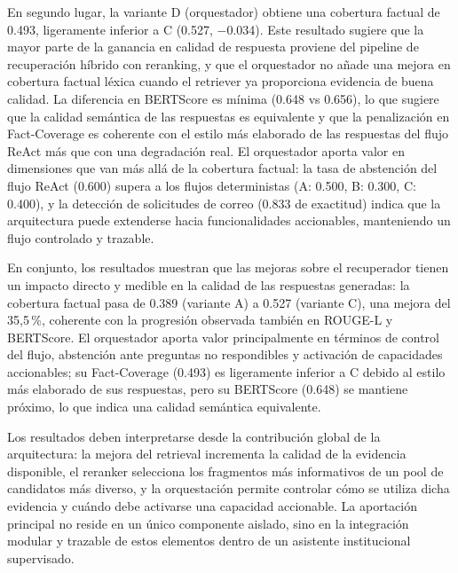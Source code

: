 En segundo lugar, la variante D (orquestador) obtiene una cobertura factual de 0.493, ligeramente inferior a C (0.527, $-$0.034).
Este resultado sugiere que la mayor parte de la ganancia en calidad de respuesta proviene del pipeline de recuperación híbrido con reranking, y que el orquestador no añade una mejora en cobertura factual léxica cuando el retriever ya proporciona evidencia de buena calidad.
La diferencia en BERTScore es mínima (0.648 vs 0.656), lo que sugiere que la calidad semántica de las respuestas es equivalente y que la penalización en Fact-Coverage es coherente con el estilo más elaborado de las respuestas del flujo ReAct más que con una degradación real.
El orquestador aporta valor en dimensiones que van más allá de la cobertura factual: la tasa de abstención del flujo ReAct (0.600) supera a los flujos deterministas (A: 0.500, B: 0.300, C: 0.400), y la detección de solicitudes de correo (0.833 de exactitud) indica que la arquitectura puede extenderse hacia funcionalidades accionables, manteniendo un flujo controlado y trazable.

En conjunto, los resultados muestran que las mejoras sobre el recuperador tienen un impacto directo y medible en la calidad de las respuestas generadas: la cobertura factual pasa de 0.389 (variante A) a 0.527 (variante C), una mejora del 35,5\,\%, coherente con la progresión observada también en ROUGE-L y BERTScore.
El orquestador aporta valor principalmente en términos de control del flujo, abstención ante preguntas no respondibles y activación de capacidades accionables; su Fact-Coverage (0.493) es ligeramente inferior a C debido al estilo más elaborado de sus respuestas, pero su BERTScore (0.648) se mantiene próximo, lo que indica una calidad semántica equivalente.

Los resultados deben interpretarse desde la contribución global de la arquitectura: la mejora del retrieval incrementa la calidad de la evidencia disponible, el reranker selecciona los fragmentos más informativos de un pool de candidatos más diverso, y la orquestación permite controlar cómo se utiliza dicha evidencia y cuándo debe activarse una capacidad accionable. 
La aportación principal no reside en un único componente aislado, sino en la integración modular y trazable de estos elementos dentro de un asistente institucional supervisado.


